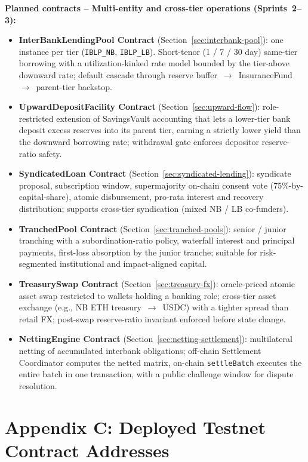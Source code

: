 \documentclass[12pt,a4paper]{report}
\begin{document}
\textbf{Planned contracts -- Multi-entity and cross-tier operations (Sprints~2--3):}
\begin{itemize}[noitemsep]
\item \textbf{InterBankLendingPool Contract} (Section~\ref{sec:interbank-pool}): one instance per tier (\texttt{IBLP\_NB}, \texttt{IBLP\_LB}). Short-tenor (1 / 7 / 30 day) same-tier borrowing with a utilization-kinked rate model bounded by the tier-above downward rate; default cascade through reserve buffer~$\to$~InsuranceFund~$\to$~parent-tier backstop.
\item \textbf{UpwardDepositFacility Contract} (Section~\ref{sec:upward-flow}): role-restricted extension of SavingsVault accounting that lets a lower-tier bank deposit excess reserves into its parent tier, earning a strictly lower yield than the downward borrowing rate; withdrawal gate enforces depositor reserve-ratio safety.
\item \textbf{SyndicatedLoan Contract} (Section~\ref{sec:syndicated-lending}): syndicate proposal, subscription window, supermajority on-chain consent vote (75\%-by-capital-share), atomic disbursement, pro-rata interest and recovery distribution; supports cross-tier syndication (mixed NB / LB co-funders).
\item \textbf{TranchedPool Contract} (Section~\ref{sec:tranched-pools}): senior / junior tranching with a subordination-ratio policy, waterfall interest and principal payments, first-loss absorption by the junior tranche; suitable for risk-segmented institutional and impact-aligned capital.
\item \textbf{TreasurySwap Contract} (Section~\ref{sec:treasury-fx}): oracle-priced atomic asset swap restricted to wallets holding a banking role; cross-tier asset exchange (e.g., NB ETH treasury~$\to$~USDC) with a tighter spread than retail FX; post-swap reserve-ratio invariant enforced before state change.
\item \textbf{NettingEngine Contract} (Section~\ref{sec:netting-settlement}): multilateral netting of accumulated interbank obligations; off-chain Settlement Coordinator computes the netted matrix, on-chain \texttt{settleBatch} executes the entire batch in one transaction, with a public challenge window for dispute resolution.
\end{itemize}


\chapter*{Appendix C: Deployed Testnet Contract Addresses}
{}
\end{document}
